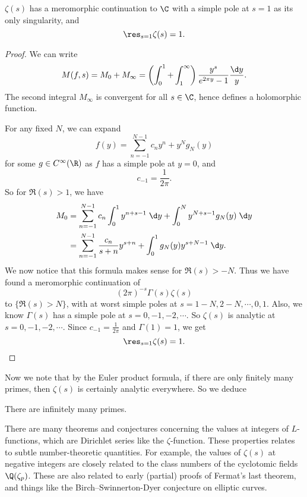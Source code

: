 \documentclass[a4paper]{article}
\begin{document}
\begin{cor}
  $\zeta(s)$ has a meromorphic continuation to $\C$ with a simple pole at $s = 1$ as its only singularity, and
  \[
    \res_{s = 1}\zeta(s) = 1.
  \]
\end{cor}

\begin{proof}
  We can write
  \[
    M(f, s) = M_0 + M_\infty = \left(\int_0^1 + \int_1^\infty\right) \frac{y^s}{e^{2\pi y} - 1} \frac{\d y}{y}.
  \]
  The second integral $M_\infty$ is convergent for all $s \in \C$, hence defines a holomorphic function.

  For any fixed $N$, we can expand
  \[
    f(y) = \sum_{n = -1}^{N - 1} c_n y^n + y^N g_N(y)
  \]
  for some $g \in C^\infty(\R)$ as $f$ has a simple pole at $y = 0$, and
  \[
    c_{-1} = \frac{1}{2\pi}.
  \]
  So for $\Re(s) > 1$, we have
  \begin{align*}
    M_0 &= \sum_{n = -1}^{N - 1} c_n \int_0^1 y^{n + s - 1} \;\d y + \int_0^N y^{N + s - 1} g_N(y) \;\d y\\
    &= \sum_{n = -1}^{N - 1} \frac{c_n}{s + n} y^{s + n} + \int_0^1 g_N(y) y^{s + N - 1} \;\d y.
  \end{align*}
  We now notice that this formula makes sense for $\Re(s) > -N$. Thus we have found a meromorphic continuation of
  \[
    (2\pi)^{-s} \Gamma(s) \zeta(s)
  \]
  to $\{\Re(s) > N\}$, with at worst simple poles at $s = 1 - N, 2 - N, \cdots, 0, 1$. Also, we know $\Gamma(s)$ has a simple pole at $s = 0, -1, -2, \cdots$. So $\zeta(s)$ is analytic at $s = 0, -1, -2, \cdots$. Since $c_{-1} = \frac{1}{2\pi}$ and $\Gamma(1) = 1$, we get
  \[
    \res_{s = 1} \zeta(s) = 1.
  \]
\end{proof}

Now we note that by the Euler product formula, if there are only finitely many primes, then $\zeta(s)$ is certainly analytic everywhere. So we deduce
\begin{cor}
  There are infinitely many primes.
\end{cor}
There are many theorems and conjectures concerning the values at integers of $L$-functions, which are Dirichlet series like the $\zeta$-function. These properties relates to subtle number-theoretic quantities. For example, the values of $\zeta(s)$ at negative integers are closely related to the class numbers of the cyclotomic fields $\Q(\zeta_p)$. These are also related to early (partial) proofs of Fermat's last theorem, and things like the Birch--Swinnerton-Dyer conjecture on elliptic curves.
\end{document}
